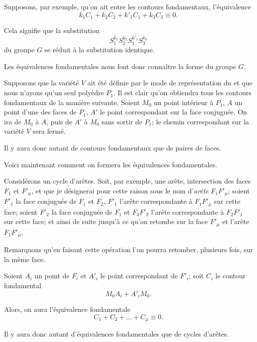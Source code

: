 \documentclass{article}
\begin{document}
Supposons, par exemple, qu'on ait entre les contours fondamentaux, l'équivalence
\[ k_{1}C_{1} + k_{2}C_{2} + k'_{1}C_{1} + k_{3}C_{3} \equiv 0. \]

Cela signifie que la substitution
\[ S^{k_{1}}_{1}S^{k_{2}}_{2}S^{k'_{1}}_{1}S^{k_{3}}_{3} \]
du groupe $G$ se réduit à la substitution identique.

Les équivalences fondamentales nous font donc connaître la forme du groupe $G$.

Supposons que la variété $V$ ait été définie par le mode de représentation du  et que nous n'ayons qu'un seul polyèdre $P_{1}$. Il est clair qu'on obtiendra tous les contours fondamentaux de la manière suivante. Soient $M_{0}$ un point intérieur à $P_{1}$, $A$ un point d'une des faces de $P_{1}$, $A'$ le point correspondant sur la face conjuguée. On ira de $M_{0}$ à $A$, puis de $A'$ à $M_{0}$ sans sortir de $P_{1}$; le chemin correspondant sur la variété $V$ sera fermé.

Il y aura donc autant de contours fondamentaux que de paires de faces.

Voici maintenant comment on formera les équivalences fondamentales.

Considérons un cycle d'arêtes. Soit, par exemple, une arête, intersection des faces $F_{1}$ et $F'_{\mu}$, et que je désignerai pour cette raison sous le nom d'\emph{arête} $F_{1}F'_{\mu}$; soient $F'_{1}$ la face conjuguée de $F_{1}$ et $F_{2}$, $F'_{1}$ l'arête correspondante à $F_{1}F'_{\mu}$ sur cette face; soient $F'_{2}$ la face conjuguée de $F_{1}$ et $F_{3}F'_{2}$ l'arête correspondante à $F_{2}F'_{1}$ sur cette face; et ainsi de suite jusqu'à ce qu'on retombe sur la face $F'_{\mu}$ et l'arête $F_{1}F'_{\mu}$.

Remarquons qu'en faisant cette opération l'on pourra retomber, plusieurs fois, sur la même face.

Soient $A_{i}$ un point de $F_{i}$ et $A'_{i}$ le point correspondant de $F'_{i}$; soit $C_{i}$ le contour fondamental
\[ M_{0}A_{i} + A'_{i}M_{0}. \]

Alors, on aura l'équivalence fondamentale
\[ C_{1} + C_{2} + \ldots + C_{\mu} \equiv 0. \]

Il y aura donc autant d'équivalences fondamentales que de cycles d'arêtes.
\end{document}

